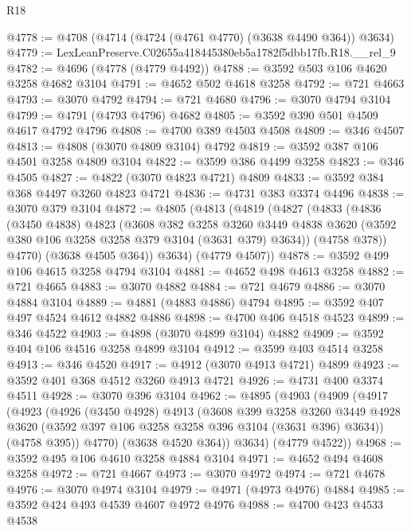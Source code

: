 \begin{lexlean}{R18}
\begin{coremodule}
@4778 := @4708 (@4714 (@4724 (@4761 @4770) (@3638 @4490 @364)) @3634)
@4779 := LexLeanPreserve.C02655a418445380eb5a1782f5dbb17fb.R18.__rel_9
@4782 := @4696 (@4778 (@4779 @4492))
@4788 := @3592 @503 @106 @4620 @3258 @4682 @3104
@4791 := @4652 @502 @4618 @3258
@4792 := @721 @4663
@4793 := @3070 @4792
@4794 := @721 @4680
@4796 := @3070 @4794 @3104
@4799 := @4791 (@4793 @4796) @4682
@4805 := @3592 @390 @501 @4509 @4617 @4792 @4796
@4808 := @4700 @389 @4503 @4508
@4809 := @346 @4507
@4813 := @4808 (@3070 @4809 @3104) @4792
@4819 := @3592 @387 @106 @4501 @3258 @4809 @3104
@4822 := @3599 @386 @4499 @3258
@4823 := @346 @4505
@4827 := @4822 (@3070 @4823 @4721) @4809
@4833 := @3592 @384 @368 @4497 @3260 @4823 @4721
@4836 := @4731 @383 @3374 @4496
@4838 := @3070 @379 @3104
@4872 := @4805
    (@4813
      (@4819
        (@4827
          (@4833
            (@4836
              (@3450 @4838)
              @4823
              (@3608
                @382
                @3258
                @3260
                @3449
                @4838
                @3620
                (@3592 @380 @106 @3258 @3258 @379 @3104 (@3631 @379) @3634))
              (@4758 @378))
            @4770)
          (@3638 @4505 @364))
        @3634)
      (@4779 @4507))
@4878 := @3592 @499 @106 @4615 @3258 @4794 @3104
@4881 := @4652 @498 @4613 @3258
@4882 := @721 @4665
@4883 := @3070 @4882
@4884 := @721 @4679
@4886 := @3070 @4884 @3104
@4889 := @4881 (@4883 @4886) @4794
@4895 := @3592 @407 @497 @4524 @4612 @4882 @4886
@4898 := @4700 @406 @4518 @4523
@4899 := @346 @4522
@4903 := @4898 (@3070 @4899 @3104) @4882
@4909 := @3592 @404 @106 @4516 @3258 @4899 @3104
@4912 := @3599 @403 @4514 @3258
@4913 := @346 @4520
@4917 := @4912 (@3070 @4913 @4721) @4899
@4923 := @3592 @401 @368 @4512 @3260 @4913 @4721
@4926 := @4731 @400 @3374 @4511
@4928 := @3070 @396 @3104
@4962 := @4895
    (@4903
      (@4909
        (@4917
          (@4923
            (@4926
              (@3450 @4928)
              @4913
              (@3608
                @399
                @3258
                @3260
                @3449
                @4928
                @3620
                (@3592 @397 @106 @3258 @3258 @396 @3104 (@3631 @396) @3634))
              (@4758 @395))
            @4770)
          (@3638 @4520 @364))
        @3634)
      (@4779 @4522))
@4968 := @3592 @495 @106 @4610 @3258 @4884 @3104
@4971 := @4652 @494 @4608 @3258
@4972 := @721 @4667
@4973 := @3070 @4972
@4974 := @721 @4678
@4976 := @3070 @4974 @3104
@4979 := @4971 (@4973 @4976) @4884
@4985 := @3592 @424 @493 @4539 @4607 @4972 @4976
@4988 := @4700 @423 @4533 @4538

\end{coremodule}
\end{lexlean}
